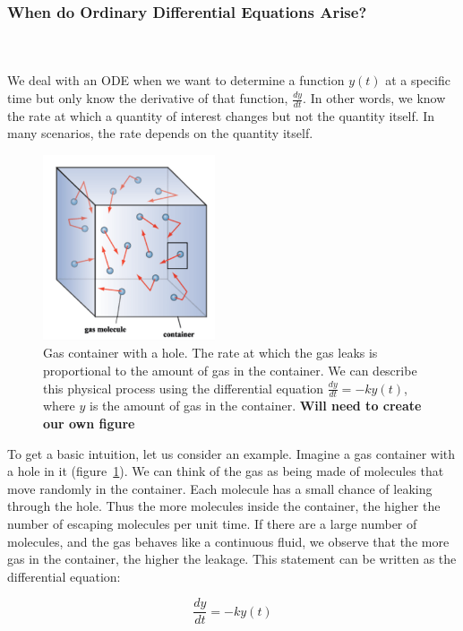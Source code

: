\documentclass[11pt]{amsart}
\begin{document}
\subsubsection{When do Ordinary Differential Equations Arise?} \ \\ \ \\
We deal with an ODE when we want to determine a function $y(t)$ at a specific time but only know the derivative of that function, $\frac{dy}{dt}$. In other words, we know the rate at which a quantity of interest changes but not the quantity itself. In many scenarios, the rate depends on the quantity itself.

\begin{figure}[!htb]
\begin{center}
\includegraphics[width=2.0in,trim=0in 0in 0 0in]{graphics/appendix/gas-container.png}
\caption{{Gas container with a hole. The rate at which the gas leaks is proportional to the amount of gas in the container. We can describe this physical process using the differential equation $ \frac{dy}{dt} = -ky(t)$, where $y$ is the amount of gas in the container. \textbf{Will need to create our own figure}}}
\label{GasContainer}
\end{center}
\end{figure}

To get a basic intuition, let us consider an example. Imagine a gas container with a hole in it  (figure~\ref{GasContainer}). We can think of the gas as being made of molecules that move randomly in the container. Each molecule has a small chance of leaking through the hole. Thus the more molecules inside the container, the higher the number of escaping molecules per unit time. If there are a large number of molecules, and the gas behaves like a continuous fluid, we observe that the more gas in the container, the higher the leakage. This statement can be written as the differential equation:

$$ \frac{dy}{dt} = -ky(t) $$
\end{document}
